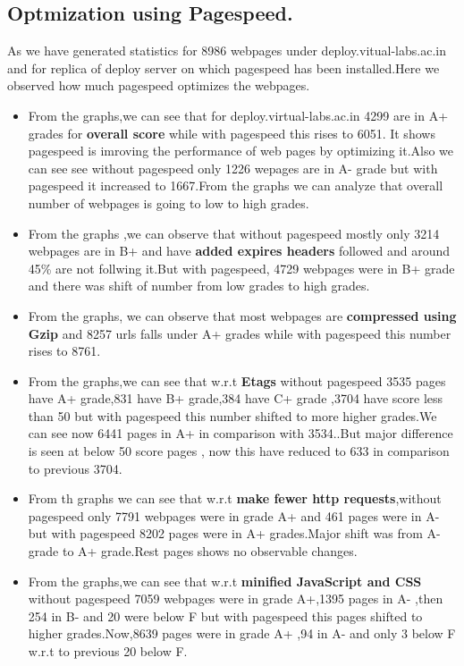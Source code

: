 \documentclass[11pt]{article}
\begin{document}
\subsection{Optmization using Pagespeed.}
\label{sec-6.2}

 As we have generated statistics for 8986 webpages under deploy.vitual-labs.ac.in and for replica of deploy server on which pagespeed has been installed.Here we observed how much pagespeed optimizes the webpages.
\begin{itemize}
\item From the graphs,we can see that for deploy.virtual-labs.ac.in 4299 are in A+ grades for \textbf{overall score} while with pagespeed this rises to 6051. It shows pagespeed is imroving the performance of web pages by optimizing it.Also we can see see without pagespeed only 1226 wepages are in A- grade but with pagespeed it increased to 1667.From the graphs we can analyze that overall number of webpages is going to low to high grades.
\item From the graphs ,we can observe that without pagespeed  mostly only 3214 webpages are in B+  and have \textbf{added expires headers} followed  and around 45\% are not follwing it.But with pagespeed, 4729 webpages were in B+ grade and there was shift of number from low grades to high grades.
\item From the graphs, we can observe that most webpages are \textbf{compressed using Gzip} and 8257 urls falls under A+ grades while with pagespeed this number rises to 8761.
\item From the graphs,we can see that w.r.t \textbf{Etags} without pagespeed 3535 pages have A+ grade,831 have B+ grade,384 have C+ grade ,3704 have score less than 50 but with pagespeed this number shifted to more higher grades.We can see now 6441 pages in A+  in comparison with 3534..But major difference is seen at below 50 score pages , now this have reduced to 633 in comparison to previous 3704.
\item From th graphs we can see that w.r.t \textbf{make fewer http requests},without pagespeed only 7791 webpages were in grade A+  and 461 pages were in A- but with pagespeed 8202 pages were in A+ grades.Major shift was from  A- grade to A+ grade.Rest pages shows no observable changes.
\item From the graphs,we can see that w.r.t \textbf{minified JavaScript and CSS} without pagespeed 7059 webpages were in grade A+,1395 pages in A- ,then 254 in B- and 20 were below F but with pagespeed this pages shifted to higher grades.Now,8639 pages were in grade A+ ,94 in A- and only 3 below F w.r.t to previous 20 below F.
\end{itemize}
\end{document}

